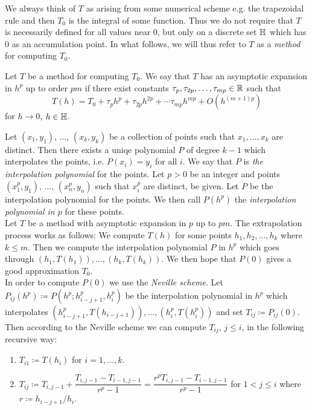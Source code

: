 We always think of \(T\) as arising from some numerical scheme e.g. the trapezoidal rule and then \(T_0\) is the integral of some function. Thus we do not require that \(T\) is necessarily defined for all values near \(0\), but only on a discrete set \(\mathbb{H}\) which has \(0\) as an accumulation point. In what follows, we will thus refer to \(T\) as a {\it method} for computing \(T_0\).

\begin{definition}
Let \(T\) be a method for computing \(T_0\). We say that \(T\) has an asymptotic expansion in \(h^p\) up to order \(pm\) if there exist constants \(\tau_p,\tau_{2p},\ldots,\tau_{mp} \in \mathbb{R}\) such that 
\begin{equation}\label{expansion}
T(h) = T_0 + \tau_ph^p + \tau_{2p}h^{2p} + \cdots \tau_{mp}h^{mp} + O(h^{(m+1)p})
\end{equation}
for \(h\rightarrow 0\), \(h\in\mathbb{H}\).
\end{definition}

Let \((x_1,y_1),\,\ldots,\,(x_k,y_k)\) be a collection of points such that \(x_1,\ldots,x_k\) are distinct. Then there exists a uniqe polynomial \(P\) of degree \(k-1\) which interpolates the points, i.e. \(P(x_i) = y_i\) for all \(i\). We say that \(P\) is {\it the interpolation polynomial} for the points. Let \(p > 0\) be an integer and points \((x_1^p,y_1),\,\ldots,\,(x_n^p,y_n)\) such that \(x_i^p\) are distinct, be given. Let \(P\) be the interpolation polynomial for the points. We then call \(P(h^p)\) the {\it interpolation polynomial in \(p\)} for these points.\\

Let \(T\) be a method with asymptotic expansion in \(p\) up to \(pm\). The extrapolation process works as follows: We compute \(T(h)\) for some points \(h_1,h_2,\ldots,h_k\) where \(k \leq m\). Then we compute the interpolation polynomial \(P\) in \(h^p\) which goes through \((h_1,T(h_1)),\ldots,(h_k,T(h_k))\). We then hope that \(P(0)\) gives a good approximation \(T_0\).\\

In order to compute \(P(0)\) we use the {\it Neville scheme}. Let \(P_{ij}(h^p) \coloneqq P(h^p; h_{i-j+1}^p, h_i^p)\) be the interpolation polynomial in \(h^p\) which interpolates \((h_{i-j+1}^p, T(h_{i-j+1})),\ldots, (h_i^p, T(h_i^p))\) and set \(T_{ij}\coloneqq P_{ij}(0)\). Then according to the Neville scheme we can compute \(T_{ij}\), \(j\leq i\), in the following recursive way:

\begin{enumerate}
    \item \(T_{i1}\coloneqq T(h_i)\) for \(i=1,\ldots,k\).
    \item \(T_{ij}\coloneqq T_{i,j-1} + \dfrac{T_{i,j-1} - T_{i-1,j-1}}{r^p - 1} = \dfrac{r^pT_{i,j-1} - T_{i-1,j-1}}{r^p-1}\) for \(1 < j \leq i\) where \(r\coloneqq h_{i-j+1}/h_i\). 
\end{enumerate}

